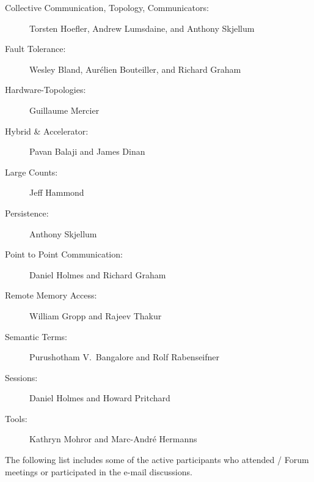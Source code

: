 {\raggedright
\begin{description}
\item[Collective Communication, Topology, Communicators:]Torsten
Hoefler, Andrew Lumsdaine, and Anthony Skjellum
\item[Fault Tolerance:]Wesley Bland, Aur\'elien Bouteiller, and Richard
Graham
\item[Hardware-Topologies:]Guillaume Mercier
\item[Hybrid \& Accelerator:]Pavan Balaji and James Dinan
\item[Large Counts:]Jeff Hammond
\item[Persistence:]Anthony Skjellum
\item[Point to Point Communication:]Daniel Holmes and Richard Graham
\item[Remote Memory Access:]William Gropp and Rajeev Thakur
\item[Semantic Terms:]Purushotham V.~Bangalore and Rolf Rabenseifner
\item[Sessions:]Daniel Holmes and Howard Pritchard
\item[Tools:]Kathryn Mohror and Marc-Andr\'e Hermanns
\end{description}
}

The following list includes some of the active participants who
attended \MPI/ Forum meetings or participated in the e-mail
discussions. %

